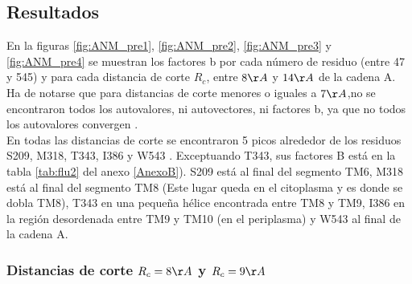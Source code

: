 \subsection{Resultados}
En la figuras \ref{fig:ANM_pre1}, \ref{fig:ANM_pre2}, \ref{fig:ANM_pre3} y \ref{fig:ANM_pre4} se muestran los factores b por cada n\'{u}mero de residuo (entre 47 y 545) y para cada distancia de corte $R_c$, entre $8\AA$ y $14\AA$ de la cadena A. Ha de notarse que para distancias de corte menores o iguales a $7\AA$,no se encontraron todos  los autovalores, ni autovectores, ni factores b, ya que no todos los autovalores convergen \cite{Zimmermann2011}.\\

En todas las distancias de corte se encontraron 5 picos alrededor de los residuos  S209, M318, T343, I386 y W543 . Exceptuando T343, sus factores B est\'{a} en la tabla \ref{tab:flu2} del anexo \ref{AnexoB}). S209 est\'{a} al final del segmento TM6, M318 est\'{a} al final del segmento TM8 (Este lugar queda en el citoplasma y es donde se dobla TM8), T343 en una peque\~{n}a h\'{e}lice encontrada entre TM8 y TM9, I386 en la regi\'{o}n desordenada entre TM9 y TM10 (en el periplasma) y W543 al final de la cadena A.\\
\subsubsection{Distancias de corte $R_c=8\AA$ y $R_c=9\AA$}

